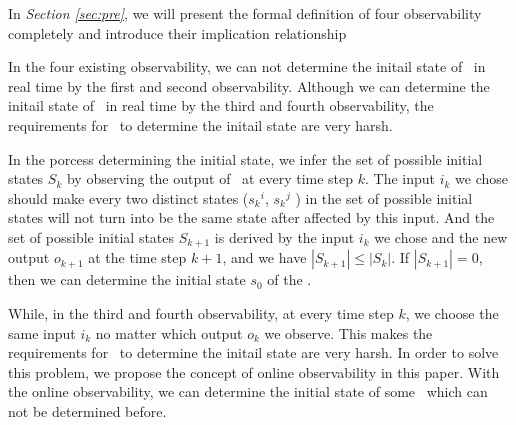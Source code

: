 

In {\em Section \ref{sec:pre}}, we will present the formal definition of four observability completely and introduce their implication relationship%

In the four existing observability, we can not determine the initail state of \BCNs\ in real time by the first and second observability. Although we can determine the initail state of \BCNs\ in real time by the third and fourth observability, the requirements for \BCNs\ to determine the initail state are very harsh. 

In the porcess determining the initial state, we infer the set of possible initial states $S_k$ by observing the output of \BCN\ at every time step $k$. The input $i_k$ we chose should make every two distinct states (${s_k}^i$, ${s_k}^j$ ) in the set of possible initial states will not turn into be the same state after affected by this input. And the set of possible initial states $S_{k+1}$ is derived by the input $i_k$ we chose and the new output $o_{k+1}$ at the time step $k+1$, and we have $|S_{k+1}|\le|S_k|$. If $|S_{k+1}|=0$, then we can determine the initial state $s_0$ of the \BCN.

While, in the third and fourth observability, at every time step $k$, we choose the same input $i_k$ no matter which output $o_k$ we observe. This makes the requirements for \BCNs\ to determine the initail state are very harsh. In order to solve this problem, we propose the concept of online observability in this paper. With the online observability, we can determine the initial state of some \BCNs\ which can not be determined before.


